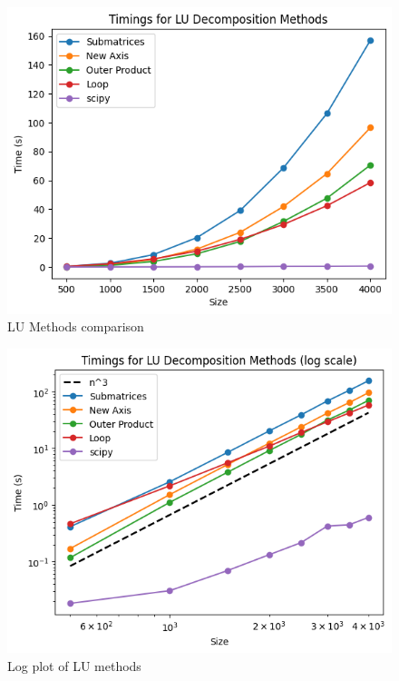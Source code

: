 \begin{figure}[H]
  \centering
    \includegraphics[scale=0.75]{Include/Images/Thesis/Analysis of Solutions/Linear Systems/LU Timings.png}
    \caption{LU Methods comparison}
    \label{fig:LU Methods comparison}
\end{figure}
\begin{figure}[H]
    \centering
    \includegraphics[scale=0.75]{Include/Images/Thesis/Analysis of Solutions/Linear Systems/LU Timings LOG.png}
    \caption{Log plot of LU methods}
    \label{fig:Log plot of LU methods}
\end{figure}

